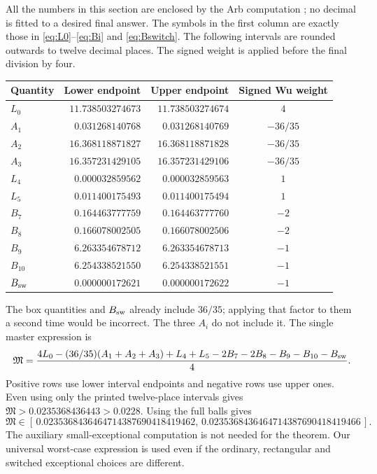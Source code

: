 \documentclass[11pt]{article}
\theoremstyle{definition}
\newcommand{\cert}[1]{\texttt{\detokenize{#1}}}
\begin{document}
All the numbers in this section are enclosed by the Arb computation
\cert{c249_verify.py}; no decimal is fitted to a desired final answer.
The symbols in the first column are exactly those in
\eqref{eq:L0}--\eqref{eq:Bi} and \eqref{eq:Bswitch}.
The following intervals are rounded outwards to twelve decimal places.
The signed weight is applied before the final division by four.
\begin{center}
\small
\begin{tabular}{@{}lrrc@{}}
\toprule
Quantity & Lower endpoint & Upper endpoint & Signed Wu weight\\
\midrule
$L_0$ & $11.738503274673$ & $11.738503274674$ & $4$\\
$A_1$ & $0.031268140768$ & $0.031268140769$ & $-36/35$\\
$A_2$ & $16.368118871827$ & $16.368118871828$ & $-36/35$\\
$A_3$ & $16.357231429105$ & $16.357231429106$ & $-36/35$\\
$L_4$ & $0.000032859562$ & $0.000032859563$ & $1$\\
$L_5$ & $0.011400175493$ & $0.011400175494$ & $1$\\
$B_7$ & $0.164463777759$ & $0.164463777760$ & $-2$\\
$B_8$ & $0.166078002505$ & $0.166078002506$ & $-2$\\
$B_9$ & $6.263354678712$ & $6.263354678713$ & $-1$\\
$B_{10}$ & $6.254338521550$ & $6.254338521551$ & $-1$\\
$B_{\rm sw}$ & $0.000000172621$ & $0.000000172622$ & $-1$\\
\bottomrule
\end{tabular}
\end{center}
The box quantities and $B_{\rm sw}$ already include $36/35$; applying
that factor to them a second time would be incorrect.
The three $A_i$ do not include it.  The single master expression is
\begin{equation}\label{eq:master}
 \mathfrak M=
 \frac{4L_0-(36/35)(A_1+A_2+A_3)+L_4+L_5
                  -2B_7-2B_8-B_9-B_{10}-B_{\rm sw}}4.
\end{equation}
Positive rows use lower interval endpoints and negative rows use upper
ones.  Even using only the printed twelve-place intervals gives
$\mathfrak M>0.0235368436443>0.0228$.
Using the full balls gives
\[
 \mathfrak M\in
[\,0.0235368436464714387690418419462,\,
    0.0235368436464714387690418419466\,].
\]
The auxiliary small-exceptional computation is not needed for the
theorem.  Our universal worst-case expression is used even if the
ordinary, rectangular and switched exceptional choices are different.
\end{document}
